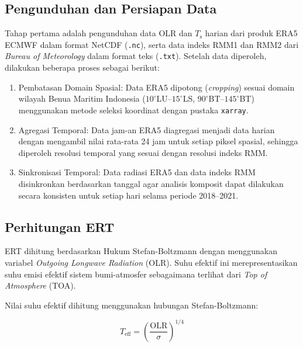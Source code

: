 \documentclass[12pt,a4paper]{report}
\begin{document}
\subsection{Pengunduhan dan Persiapan Data}

Tahap pertama adalah pengunduhan data OLR dan $T_{\mathrm{s}}$ harian dari produk ERA5 ECMWF
dalam format NetCDF (\texttt{.nc}), serta data indeks RMM1 dan RMM2 dari
\textit{Bureau of Meteorology} dalam format teks (\texttt{.txt}). Setelah data
diperoleh, dilakukan beberapa proses sebagai berikut:

\begin{enumerate}
  \item {Pembatasan Domain Spasial:} Data ERA5 dipotong (\textit{cropping})
    sesuai domain wilayah Benua Maritim Indonesia ($10^{\circ}$LU--$15^{\circ}$LS,
    $90^{\circ}$BT--$145^{\circ}$BT) menggunakan metode seleksi koordinat
    dengan pustaka \texttt{xarray}.

  \item {Agregasi Temporal:} Data jam-an ERA5 diagregasi menjadi data
    harian dengan mengambil nilai rata-rata 24 jam untuk setiap piksel spasial,
    sehingga diperoleh resolusi temporal yang sesuai dengan resolusi indeks RMM.

  \item {Sinkronisasi Temporal:} Data radiasi ERA5 dan data indeks RMM
    disinkronkan berdasarkan tanggal agar analisis komposit dapat dilakukan
    secara konsisten untuk setiap hari selama periode 2018--2021.

\end{enumerate}

\subsection{Perhitungan ERT}

ERT dihitung berdasarkan Hukum Stefan-Boltzmann dengan menggunakan
variabel \textit{Outgoing Longwave Radiation} (OLR). Suhu efektif ini
merepresentasikan suhu emisi efektif sistem bumi-atmosfer sebagaimana
terlihat dari \textit{Top of Atmosphere} (TOA).

Nilai suhu efektif dihitung menggunakan hubungan Stefan-Boltzmann:

\begin{equation}
  T_{\mathrm{eff}} =
  \left(\frac{\mathrm{OLR}}{\sigma}\right)^{1/4}
  \label{eq:teff_olr}
\end{equation}
\end{document}
